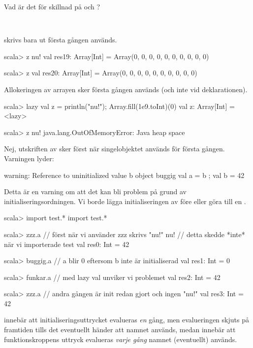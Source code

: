 \Subtask Vad är det för skillnad på  och ?

\SOLUTION

\TaskSolved \what~

\SubtaskSolved {} skrivs bara ut första gången  används.
\begin{REPL}
scala> z
nu!
val res19: Array[Int] = Array(0, 0, 0, 0, 0, 0, 0, 0, 0, 0)

scala> z
val res20: Array[Int] = Array(0, 0, 0, 0, 0, 0, 0, 0, 0, 0)
\end{REPL}

\SubtaskSolved Allokeringen av arrayen sker första gången  används (och inte vid deklarationen).
\begin{REPL}
scala> lazy val z = { println("nu!"); Array.fill(1e9.toInt)(0)}
val z: Array[Int] = <lazy>

scala> z
nu!
java.lang.OutOfMemoryError: Java heap space
\end{REPL}

\SubtaskSolved Nej, utskriften av  sker först när singelobjektet  används för första gången. Varningen lyder:
\begin{REPL}
warning: Reference to uninitialized value b
         object buggig { val a = b ; val b = 42}
\end{REPL}
\noindent Detta är en varning om att det kan bli problem på grund av initialiseringsordningen. Vi borde lägga initialiseringen av  före  eller göra  till en .

\SubtaskSolved
\begin{REPL}
scala> import test.*
import test.*

scala> zzz.a      // först när vi använder zzz skrivs "nu!"
nu!               // detta skedde *inte* när vi importerade test
val res0: Int = 42

scala> buggig.a   // a blir 0 eftersom b inte är initialiserad
val res1: Int = 0

scala> funkar.a   // med lazy val unviker vi problemet
val res2: Int = 42


scala> zzz.a     // andra gången är init redan gjort och ingen "nu!"
val res3: Int = 42
\end{REPL}

\SubtaskSolved {} innebär att initialiseringsuttrycket evalueras \emph{en} gång, men evalueringen skjuts på framtiden tills det eventuellt händer att namnet  används, medan  innebär att funktionskroppens uttryck evalueras \emph{varje gång} namnet  (eventuellt) används.


